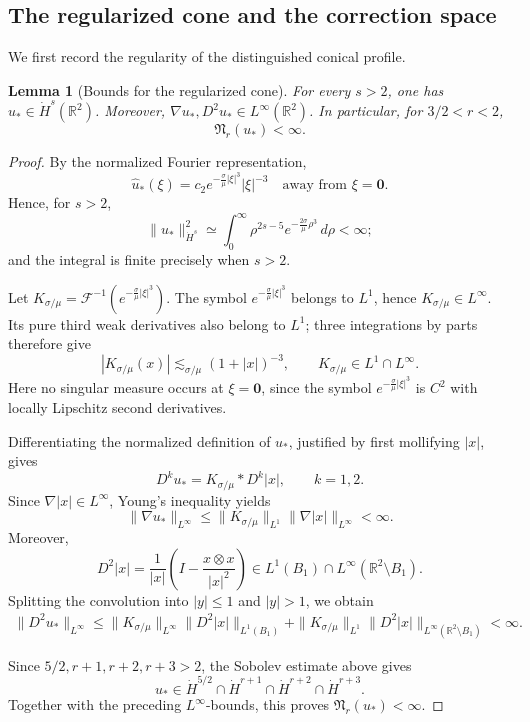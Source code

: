 \documentclass[12pt]{amsart}
\newtheorem{lemma}[theorem]{Lemma}
\theoremstyle{remark}
\theoremstyle{definition}
\numberwithin{equation}{section}
\newcommand{\R}{\mathbb{R}}
\begin{document}
\subsection{The regularized cone and the correction space}

We first record the regularity of the distinguished conical profile.

\begin{lemma}[Bounds for the regularized cone]
\label{lem:regularized-cone-revised}
For every \(s>2\), one has \(u_*\in\dot H^s(\R^2)\).
Moreover, \(\nabla u_*,D^2u_*\in L^\infty(\R^2)\).
In particular, for \(3/2<r<2\),
\[
 \mathfrak N_r(u_*)<\infty.
\]
\end{lemma}

\begin{proof}
By the normalized Fourier representation,
\[
 \widehat u_*(\xi)=c_2e^{-\frac{\sigma}{\mu}|\xi|^3}|\xi|^{-3}
 \quad\text{away from }\xi= \mathbf{0}.
\]
Hence, for \(s>2\),
\[
 \|u_*\|_{\dot H^s}^2
 \simeq\int_0^\infty\rho^{2s-5}e^{-\frac{2\sigma}{\mu}\rho^3}\,d\rho<\infty;
\]
and the integral is finite precisely when \(s>2\).

Let
\(K_{\sigma/\mu}=\mathcal F^{-1}(e^{-\frac{\sigma}{\mu}|\xi|^3})\).
The symbol \(e^{-\frac{\sigma}{\mu}|\xi|^3}\) belongs to \(L^1\), hence
\(K_{\sigma/\mu}\in L^\infty\).
Its pure third weak derivatives also belong to \(L^1\); three integrations by parts therefore give
\[
 |K_{\sigma/\mu}(x)|\lesssim_{\sigma/\mu}(1+|x|)^{-3},
 \qquad K_{\sigma/\mu}\in L^1\cap L^\infty.
\]
Here no singular measure occurs at \(\xi=\mathbf{0}\), since the symbol
\(e^{-\frac{\sigma}{\mu}|\xi|^3}\) is \(C^2\) with locally Lipschitz
second derivatives.

Differentiating the normalized definition of \(u_*\), justified by
first mollifying \(|x|\), gives
\[
 D^ku_*=K_{\sigma/\mu}*D^k|x|,
 \qquad k=1,2.
\]
Since \(\nabla|x|\in L^\infty\), Young's inequality yields
\[
 \|\nabla u_*\|_{L^\infty}
 \leq
 \|K_{\sigma/\mu}\|_{L^1}\|\nabla|x|\|_{L^\infty}
 <\infty.
\]
Moreover,
\[
 D^2|x|
 =
 \frac1{|x|}
 \left(
  I-\frac{x\otimes x}{|x|^2}
 \right)
 \in
 L^1(B_1)\cap L^\infty(\R^2\setminus B_1).
\]
Splitting the convolution into \(|y|\leq1\) and \(|y|>1\), we obtain
\begin{align*}
 \|D^2u_*\|_{L^\infty}
 \leq
 \|K_{\sigma/\mu}\|_{L^\infty}
 \|D^2|x|\|_{L^1(B_1)}+
 \|K_{\sigma/\mu}\|_{L^1}
 \|D^2|x|\|_{L^\infty(\R^2\setminus B_1)}
 <\infty.
\end{align*}

Since \(5/2,r+1,r+2,r+3>2\), the Sobolev estimate above gives
\[
 u_*\in \dot H^{5/2} \cap\dot H^{r+1} \cap\dot H^{r+2} \cap\dot H^{r+3}.
\]
Together with the preceding \(L^\infty\)-bounds, this proves
\(\mathfrak N_r(u_*)<\infty\).
\end{proof}
\end{document}
